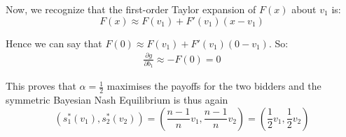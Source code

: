 \documentclass[11pt,a4paper]{article}
\begin{document}
Now, we recognize that the first-order Taylor expansion of $F(x)$ about $v_1$ is: $$F(x) \approx F(v_1)+F'(v_1)(x-v_1)$$

Hence we can say that $F(0) \approx F(v_1)+F'(v_1)(0-v_1)$. So:
\begin{align*}
\frac{\partial g}{\partial b_1} \approx -F(0) = 0
\end{align*}

This proves that $\alpha = \frac{1}{2}$ maximises the payoffs for the two bidders and the symmetric Bayesian Nash Equilibrium is thus again $$(s_1^*(v_1),s_2^*(v_2))=(\frac{n-1}{n}v_1, \frac{n-1}{n}v_2) = (\frac{1}{2}v_1,\frac{1}{2}v_2)$$
\end{document}
